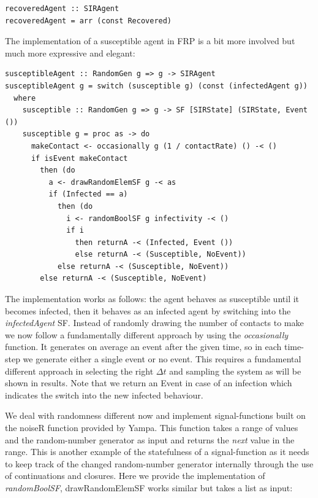 \begin{verbatim}
recoveredAgent :: SIRAgent
recoveredAgent = arr (const Recovered)
\end{verbatim}

The implementation of a susceptible agent in FRP is a bit more involved but much more expressive and elegant:

\begin{verbatim}
susceptibleAgent :: RandomGen g => g -> SIRAgent
susceptibleAgent g = switch (susceptible g) (const (infectedAgent g))
  where
    susceptible :: RandomGen g => g -> SF [SIRState] (SIRState, Event ())
    susceptible g = proc as -> do
      makeContact <- occasionally g (1 / contactRate) () -< ()
      if isEvent makeContact
        then (do
          a <- drawRandomElemSF g -< as
          if (Infected == a)
            then (do
              i <- randomBoolSF g infectivity -< ()
              if i
                then returnA -< (Infected, Event ())
                else returnA -< (Susceptible, NoEvent))
            else returnA -< (Susceptible, NoEvent))
        else returnA -< (Susceptible, NoEvent)
\end{verbatim}

The implementation works as follows: the agent behaves as susceptible until it becomes infected, then it behaves as an infected agent by switching into the \textit{infectedAgent} SF.
Instead of randomly drawing the number of contacts to make we now follow a fundamentally different approach by using the \textit{occasionally} function. It generates on average an event after the given time, so in each time-step we generate either a single event or no event. This requires a fundamental different approach in selecting the right $\Delta t$ and sampling the system as will be shown in results. Note that we return an Event in case of an infection which indicates the switch into the new infected behaviour.

We deal with randomness different now and implement signal-functions built on the noiseR function provided by Yampa. This function takes a range of values and the random-number generator as input and returns the \textit{next} value in the range. This is another example of the statefulness of a signal-function as it needs to keep track of the changed random-number generator internally through the use of continuations and closures. Here we provide the implementation of \textit{randomBoolSF}, drawRandomElemSF works similar but takes a list as input:

